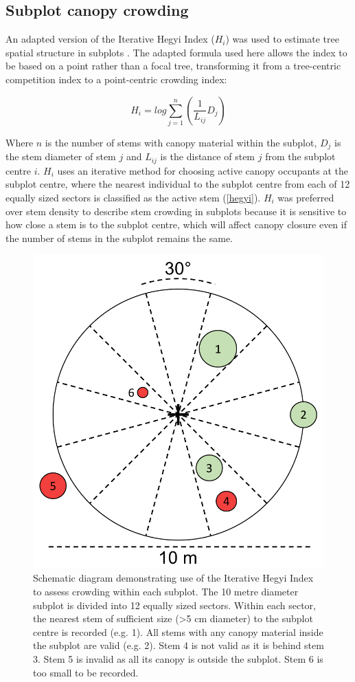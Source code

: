 \documentclass[11pt,a4paper]{article}
\begin{document}
\subsection{Subplot canopy crowding}

An adapted version of the Iterative Hegyi Index ($H_{i}$) was used to estimate tree spatial structure in subplots \citep{Hegyi1974}. The adapted formula used here allows the index to be based on a point rather than a focal tree, transforming it from a tree-centric competition index to a point-centric crowding index:

\begin{equation}
	H_{i} = log\sum_{j=1}^{n} (\frac{1}{L_{ij}} D_{j})
\end{equation}

Where $n$ is the number of stems with canopy material within the subplot, $D_{j}$ is the stem diameter of stem $j$ and $L_{ij}$ is the distance of stem $j$ from the subplot centre $i$. $H_{i}$ uses an iterative method for choosing active canopy occupants at the subplot centre, where the nearest individual to the subplot centre from each of 12 equally sized sectors is classified as the active stem (\autoref{hegyi}). $H_{i}$ was preferred over stem density to describe stem crowding in subplots because it is sensitive to how close a stem is to the subplot centre, which will affect canopy closure even if the number of stems in the subplot remains the same. 

\begin{figure}
	\includegraphics[width=0.6\linewidth]{hegyi}
	\caption{Schematic diagram demonstrating use of the Iterative Hegyi Index to assess crowding within each subplot. The 10 metre diameter subplot is divided into 12 equally sized sectors. Within each sector, the nearest stem of sufficient size (>5 cm diameter) to the subplot centre is recorded (e.g. 1). All stems with any canopy material inside the subplot are valid (e.g. 2). Stem 4 is not valid as it is behind stem 3. Stem 5 is invalid as all its canopy is outside the subplot. Stem 6 is too small to be recorded.}
	\label{hegyi}
\end{figure}

\FloatBarrier{}
\printbibliography
\end{document}
